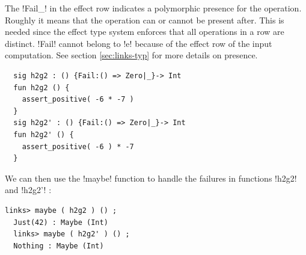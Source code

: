 \documentclass[11pt, nonacm=true, language=french, language=english]{acmart}
\begin{document}
\begin{ex}
The !Fail{_}! in the effect row indicates a polymorphic presence for the operation. Roughly it means that the operation can or cannot be present after. This is needed since the effect type system enforces that all operations in a row are distinct. !Fail! cannot belong to !e! because of the effect row of the input computation. See section \ref{sec:links-typ} for more details on presence.

\begin{lstlisting}
  sig h2g2 : () {Fail:() => Zero|_}-> Int
  fun h2g2 () {
    assert_positive( -6 * -7 )
  }
  sig h2g2' : () {Fail:() => Zero|_}-> Int
  fun h2g2' () {
    assert_positive( -6 ) * -7
  }
\end{lstlisting}

We can then use the !maybe! function to handle the failures in functions !h2g2! and !h2g2'! :

\begin{lstlisting}[caption=Links console]
  links> maybe ( h2g2 ) () ;
  Just(42) : Maybe (Int)
  links> maybe ( h2g2' ) () ;
  Nothing : Maybe (Int)
\end{lstlisting}

\end{ex}
\end{document}
